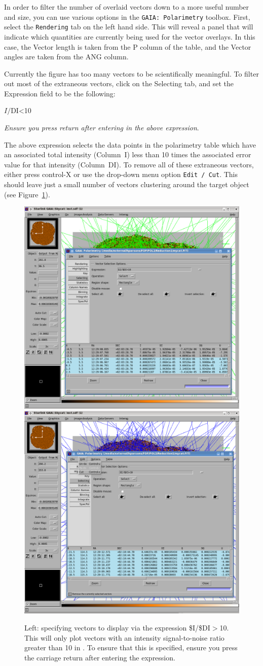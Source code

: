 In order to filter the number of overlaid vectors down to a more
useful number and size, you can use various options in the
\texttt{GAIA: Polarimetry} toolbox. First, select the
\texttt{Rendering} tab on the
left hand side. This will reveal a panel that will indicate which
quantities are currently being used for the vector overlays. In this
case, the Vector length is taken from the P column of the table, and
the Vector angles are taken from the ANG column.

Currently the figure has too many vectors to be scientifically
meaningful. To filter out most of the extraneous vectors, click on the
Selecting tab, and set the Expression field to be the following:

\begin{terminalv}
$I/$DI<10
\end{terminalv}

\emph{Ensure you press return after entering in the above expression}.

The above expression selects the data points in the polarimetry table
which have an associated total intensity (Column~I) less than 10 times
the associated error value for that intensity (Column~DI). To remove
all of these extraneous vectors, either press control-X or use the
drop-down menu option \texttt{Edit / Cut}.  This should leave just a
small number of vectors clustering around the target object (see
Figure~\ref{fig:gaiavectorssecond}).

\begin{figure}[t!]
\begin{center}
\includegraphics[width=0.46\linewidth]{sc22-gaia-plot-vectors-4.png}
\includegraphics[width=0.46\linewidth]{sc22-gaia-plot-vectors-6.png}
\caption [Selecting Vectors in GAIA]{Left: specifying vectors
  to display via the expression \$I/\$DI$>$10. This will only plot
  vectors with an intensity signal-to-noise
  ratio greater than 10 in \GAIA. To ensure that this is specified,
  ensure you press the carriage return after entering the expression.
}
\label{fig:gaiavectorssecond}
\end{center}
\end{figure}

